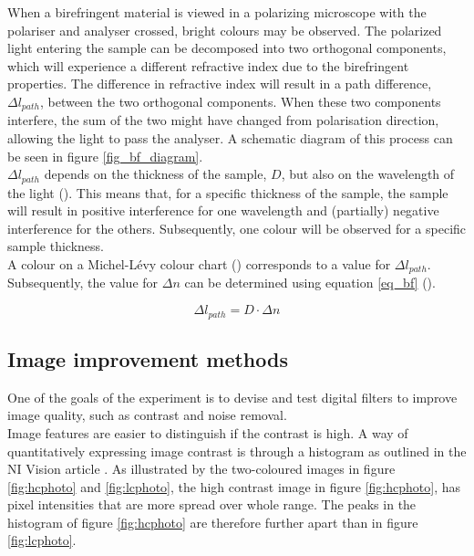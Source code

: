 When a birefringent material is viewed in a polarizing microscope with the polariser and analyser crossed, bright colours may be observed. The polarized light entering the sample can be decomposed into two orthogonal components, which will experience a different refractive index due to the birefringent properties. The difference in refractive index will result in a path difference, $\Delta l_{path}$, between the two orthogonal components. When these two components interfere, the sum of the two might have changed from polarisation direction, allowing the light to pass the analyser. A schematic diagram of this process can be seen in figure \ref{fig_bf_diagram}. \\
$\Delta l_{path}$ depends on the thickness of the sample, $D$, but also on the wavelength of the light (\cite{hecht}). This means that, for a specific thickness of the sample, the sample will result in positive interference for one wavelength and (partially) negative interference for the others. Subsequently, one colour will be observed for a specific sample thickness.\\
A colour on a Michel-L\'evy colour chart (\cite{bf_chart}) corresponds to a value for $\Delta l_{path}$. Subsequently, the value for $\Delta n$ can be determined using equation \eqref{eq_bf} (\cite{hecht}).  

\begin{equation}
	\label{eq_bf}
	\Delta l_{path} = D \cdot \Delta n
\end{equation}
	



\subsection{Image improvement methods}
One of the goals of the experiment is to devise and test digital filters to improve image quality, such as contrast and noise removal.\\
Image features are easier to distinguish if the contrast is high. A way of quantitatively expressing image contrast is through a histogram as outlined in the NI Vision article \cite{histogram_theory}. As illustrated by the two-coloured images in figure \ref{fig:hcphoto} and \ref{fig:lcphoto}, the high contrast image in figure \ref{fig:hcphoto}, has pixel intensities that are more spread over whole range. The peaks in the histogram of figure \ref{fig:hcphoto} are therefore further apart than in figure \ref{fig:lcphoto}.


